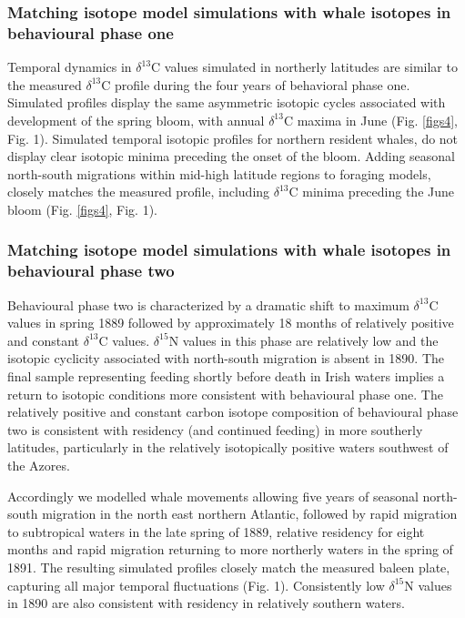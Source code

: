 \documentclass[a4paper,12pt]{article}
\begin{document}
\subsubsection*{Matching isotope model simulations with whale isotopes in behavioural phase one}
Temporal dynamics in $\delta^{13}$C values simulated in northerly latitudes are similar to the measured $\delta^{13}$C profile during the four years of behavioral phase one. 
Simulated profiles display the same asymmetric isotopic cycles associated with development of the spring bloom, with annual $\delta^{13}$C maxima in June (Fig. \ref{figs4}, Fig. 1). 
Simulated temporal isotopic profiles for northern resident whales, do not display clear isotopic minima preceding the onset of the bloom. 
Adding seasonal north-south migrations within mid-high latitude regions to foraging models, closely matches the measured profile, including $\delta^{13}$C minima preceding the June bloom (Fig. \ref{figs4}, Fig. 1).
 
\subsubsection*{Matching isotope model simulations with whale isotopes in behavioural phase two}
Behavioural phase two is characterized by a dramatic shift to maximum $\delta^{13}$C values in spring 1889 followed by approximately 18 months of relatively positive and constant $\delta^{13}$C values. 
$\delta^{15}$N values in this phase are relatively low and the isotopic cyclicity associated with north-south migration is absent in 1890. 
The final sample representing feeding shortly before death in Irish waters implies a return to isotopic conditions more consistent with behavioural phase one. 
The relatively positive and constant carbon isotope composition of behavioural phase two is consistent with residency (and continued feeding) in more southerly latitudes, particularly in the relatively isotopically positive waters southwest of the Azores.
 
Accordingly we modelled whale movements allowing five years of seasonal north-south migration in the north east northern Atlantic, followed by rapid migration to subtropical waters in the late spring of 1889, relative residency for eight months and rapid migration returning to more northerly waters in the spring of 1891.
The resulting simulated profiles closely match the measured baleen plate, capturing all major temporal fluctuations (Fig. 1). 
Consistently low $\delta^{15}$N values in 1890 are also consistent with residency in relatively southern waters. 
 
\end{document}
